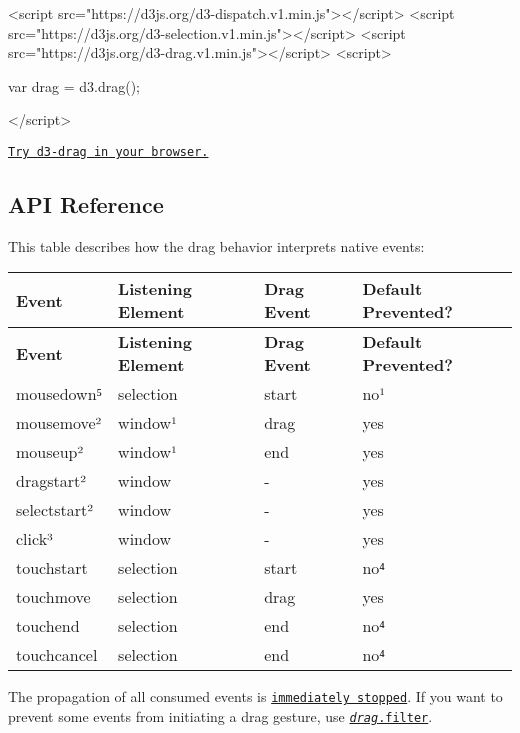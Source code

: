 \begin{DoxyCode}
<script src="https://d3js.org/d3-dispatch.v1.min.js"></script>
<script src="https://d3js.org/d3-selection.v1.min.js"></script>
<script src="https://d3js.org/d3-drag.v1.min.js"></script>
<script>

var drag = d3.drag();

</script>
\end{DoxyCode}


\href{https://tonicdev.com/npm/d3-drag}{\tt Try d3-\/drag in your browser.}

\subsection*{A\+PI Reference}

This table describes how the drag behavior interprets native events\+:

\tabulinesep=1mm
\begin{longtabu} spread 0pt [c]{*{4}{|X[-1]}|}
\hline
\rowcolor{\tableheadbgcolor}\textbf{ Event  }&\textbf{ Listening Element  }&\textbf{ Drag Event  }&\textbf{ Default Prevented?   }\\
\endfirsthead
\hline
\endfoot
\hline
\rowcolor{\tableheadbgcolor}\textbf{ Event  }&\textbf{ Listening Element  }&\textbf{ Drag Event  }&\textbf{ Default Prevented?   }\\
\endhead
mousedown⁵  &selection  &start  &no¹   \\
mousemove²  &window¹  &drag  &yes   \\
mouseup²  &window¹  &end  &yes   \\
dragstart²  &window  &-\/  &yes   \\
selectstart²  &window  &-\/  &yes   \\
click³  &window  &-\/  &yes   \\
touchstart  &selection  &start  &no⁴   \\
touchmove  &selection  &drag  &yes   \\
touchend  &selection  &end  &no⁴   \\
touchcancel  &selection  &end  &no⁴   \\
\end{longtabu}


The propagation of all consumed events is \href{https://dom.spec.whatwg.org/#dom-event-stopimmediatepropagation}{\tt immediately stopped}. If you want to prevent some events from initiating a drag gesture, use \href{#drag_filter}{\tt {\itshape drag}.filter}.

